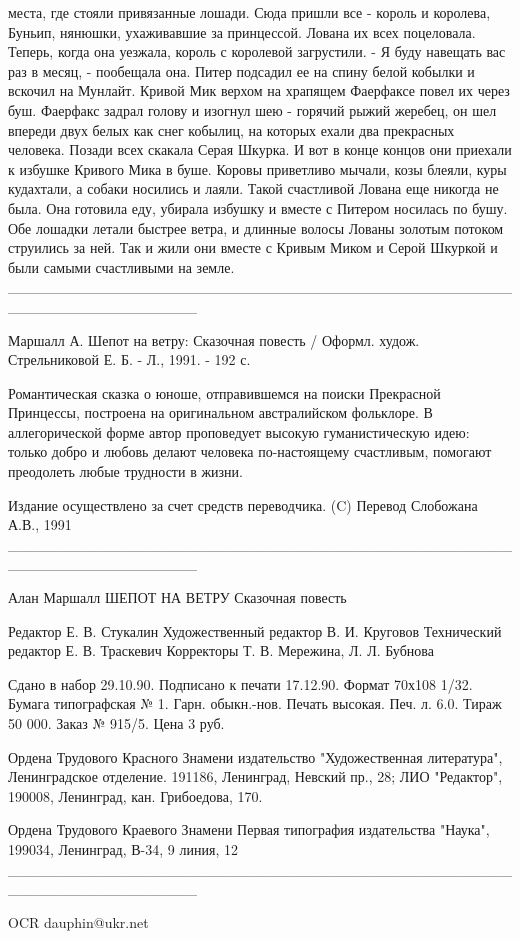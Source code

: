 места, где стояли привязанные лошади. Сюда пришли все - король и 
королева, Буньип, нянюшки, ухаживавшие за принцессой. Лована их всех 
поцеловала. Теперь, когда она уезжала, король с королевой загрустили.
    - Я буду навещать вас раз в месяц, - пообещала она.
    Питер подсадил ее на спину белой кобылки и вскочил на Мунлайт. 
Кривой Мик верхом на храпящем Фаерфаксе повел их через буш. Фаерфакс 
задрал голову и изогнул шею - горячий рыжий жеребец, он шел впереди 
двух белых как снег кобылиц, на которых ехали два прекрасных человека. 
Позади всех скакала Серая Шкурка.
    И вот в конце концов они приехали к избушке Кривого Мика в буше. 
Коровы приветливо мычали, козы блеяли, куры кудахтали, а собаки 
носились и лаяли. Такой счастливой Лована еще никогда не была.
    Она готовила еду, убирала избушку и вместе с Питером носилась по 
бушу. Обе лошадки летали быстрее ветра, и длинные волосы Лованы 
золотым потоком струились за ней.
    Так и жили они вместе с Кривым Миком и Серой Шкуркой и были самыми 
счастливыми на земле.
__________________________________________________________________

    Маршалл А. Шепот на ветру: Сказочная повесть / Оформл. худож. 
Стрельниковой Е. Б. - Л., 1991. - 192 с.

    Романтическая сказка о юноше, отправившемся на поиски Прекрасной 
Принцессы, построена на оригинальном австралийском фольклоре.
    В аллегорической форме автор проповедует высокую гуманистическую 
идею: только добро и любовь делают человека по-настоящему счастливым, 
помогают преодолеть любые трудности в жизни.

    Издание осуществлено за счет средств переводчика.
    (C) Перевод Слобожана А.В., 1991
__________________________________________________________________

    Алан Маршалл
    ШЕПОТ НА ВЕТРУ
    Сказочная повесть

    Редактор Е. В. Стукалин
    Художественный редактор В. И. Круговов
    Технический редактор Е. В. Траскевич
    Корректоры Т. В. Мережина, Л. Л. Бубнова

    Сдано в набор 29.10.90. Подписано к печати 17.12.90.
    Формат 70х108 1/32. Бумага типографская № 1.
    Гарн. обыкн.-нов. Печать высокая. Печ. л. 6.0.
    Тираж 50 000. Заказ № 915/5. Цена 3 руб.

    Ордена Трудового Красного Знамени издательство "Художественная 
литература", Ленинградское отделение. 191186, Ленинград, Невский пр., 
28; ЛИО "Редактор", 190008, Ленинград, кан. Грибоедова, 170.

    Ордена Трудового Краевого Знамени Первая типография издательства 
"Наука", 199034, Ленинград, В-34, 9 линия, 12
__________________________________________________________________

    OCR dauphin@ukr.net
